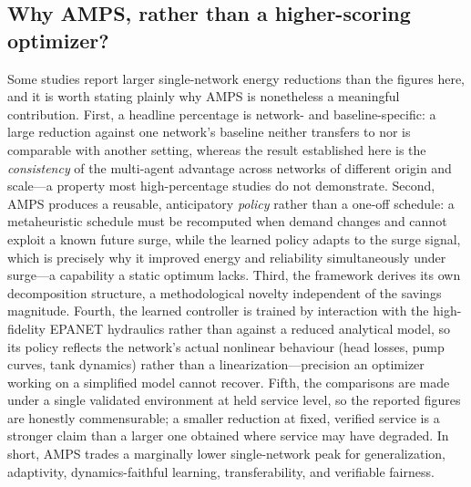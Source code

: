 \documentclass[11pt,a4paper]{article}
\begin{document}
\subsection{Why AMPS, rather than a higher-scoring optimizer?}
\label{sec:positioning}
Some studies report larger single-network energy reductions than the figures
here, and it is worth stating plainly why AMPS is nonetheless a meaningful
contribution. First, a headline percentage is network- and baseline-specific: a
large reduction against one network's baseline neither transfers to nor is
comparable with another setting, whereas the result established here is the
\emph{consistency} of the multi-agent advantage across networks of different
origin and scale---a property most high-percentage studies do not demonstrate.
Second, AMPS produces a reusable, anticipatory \emph{policy} rather than a one-off
schedule: a metaheuristic schedule must be recomputed when demand changes and
cannot exploit a known future surge, while the learned policy adapts to the surge
signal, which is precisely why it improved energy and reliability simultaneously
under surge---a capability a static optimum lacks. Third, the framework derives
its own decomposition structure, a methodological novelty independent of the
savings magnitude. Fourth, the learned controller is trained by interaction with
the high-fidelity EPANET hydraulics rather than against a reduced analytical
model, so its policy reflects the network's actual nonlinear behaviour (head
losses, pump curves, tank dynamics) rather than a linearization---precision an
optimizer working on a simplified model cannot recover. Fifth, the comparisons
are made under a single validated environment at held service level, so the
reported figures are honestly commensurable; a smaller reduction at fixed,
verified service is a stronger claim than a larger one obtained where service may
have degraded. In short, AMPS trades a marginally lower single-network peak for
generalization, adaptivity, dynamics-faithful learning, transferability, and
verifiable fairness.
\end{document}
